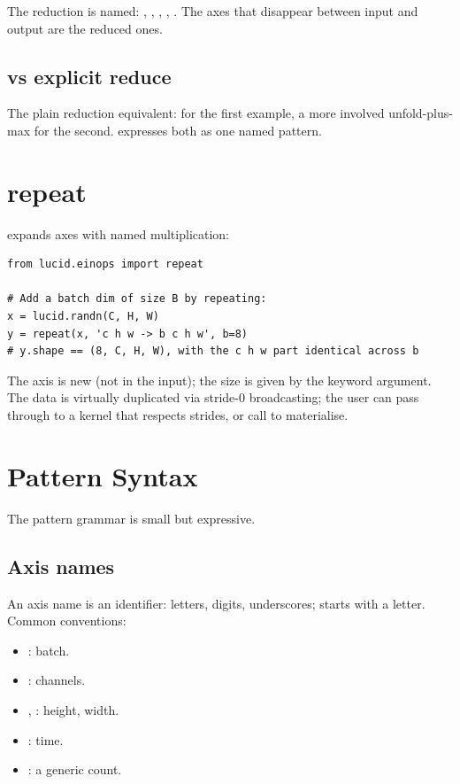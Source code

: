 The reduction is named: , , ,
, . The axes that disappear between
input and output are the reduced ones.

\subsection{vs explicit reduce}
\label{ssec:einops:vs_explicit_reduce}

The plain reduction equivalent:  for
the first example, a more involved unfold-plus-max for the
second.  expresses both as one named pattern.

\section{repeat}
\label{sec:einops:repeat}

 expands axes with named multiplication:

\begin{lstlisting}[style=lucid,language=LucidPython]
from lucid.einops import repeat

# Add a batch dim of size B by repeating:
x = lucid.randn(C, H, W)
y = repeat(x, 'c h w -> b c h w', b=8)
# y.shape == (8, C, H, W), with the c h w part identical across b
\end{lstlisting}

The  axis is new (not in the input); the size is given by
the keyword argument. The data is virtually duplicated via
stride-0 broadcasting; the user can pass through to a kernel that
respects strides, or call  to materialise.

\section{Pattern Syntax}
\label{sec:einops:syntax}

The pattern grammar is small but expressive.

\subsection{Axis names}
\label{ssec:einops:axis_names}

An axis name is an identifier: letters, digits, underscores;
starts with a letter. Common conventions:

\begin{itemize}
  \item {}: batch.
  \item {}: channels.
  \item {}, : height, width.
  \item {}: time.
  \item {}: a generic count.
\end{itemize}

